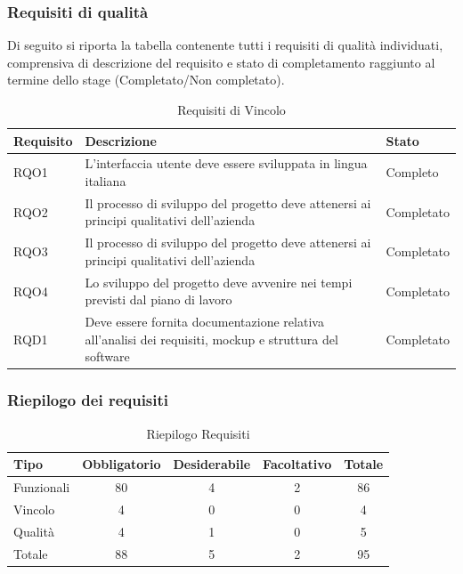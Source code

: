 \subsubsection{Requisiti di qualità}
    Di seguito si riporta la tabella contenente tutti i requisiti di qualità individuati, comprensiva di descrizione del requisito e stato di completamento raggiunto al termine dello stage (Completato/Non completato).
    \renewcommand{\arraystretch}{1.5}%
    \begin{longtable}{| p{3cm} | p{9cm} | p{3cm} |}
        \caption[Requisiti di Vincolo]{Requisiti di Vincolo}
        \label{tabella:req0}
        \endlastfoot
        \hline
        \textbf{Requisito} & \textbf{Descrizione} & \textbf{Stato}\\
        \hline
        \endhead
        RQO1 & L'interfaccia utente deve essere sviluppata in lingua italiana & Completo
        \\ \hline
        
        RQO2 & Il processo di sviluppo del progetto deve attenersi ai principi qualitativi dell'azienda & Completato
        \\ \hline
        
        RQO3 & Il processo di sviluppo del progetto deve attenersi ai principi qualitativi dell'azienda & Completato
        \\ \hline
        
        RQO4 &  Lo sviluppo del progetto deve avvenire nei tempi previsti dal piano di lavoro & Completato
        \\ \hline
        
        RQD1 &  Deve essere fornita documentazione relativa all'analisi dei requisiti, mockup e struttura del software & Completato
        \\ \hline
    \end{longtable}
    \newpage
\subsubsection{Riepilogo dei requisiti}
    \normalsize
    \renewcommand{\arraystretch}{1.5}%
    \begin{longtable}{| p{3cm} | c | c | c || c |}
        \caption[Riepilogo Requisiti]{Riepilogo Requisiti}
        \label{tabella:riepilogorequi}
        \endlastfoot
        \hline
        \textbf{Tipo} & \textbf{Obbligatorio} & \textbf{Desiderabile} & \textbf{Facoltativo} & Totale\\
        \hline
        Funzionali & 80 & 4 & 2 & 86\\ \hline
        Vincolo & 4 & 0 & 0 & 4\\ \hline
        Qualità & 4 & 1 & 0 & 5\\ \hline \hline
        Totale & 88 & 5 & 2 & 95\\ \hline
    \end{longtable}

